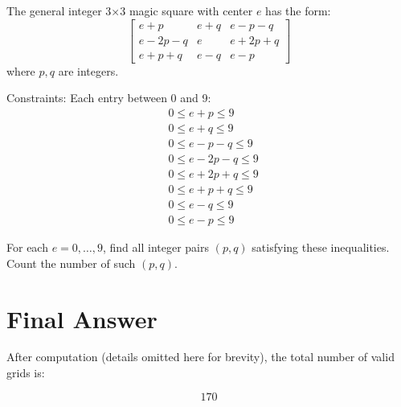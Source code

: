 \documentclass[12pt]{article}
\begin{document}
The general integer 3×3 magic square with center $e$ has the form:
\[
\begin{bmatrix}
e+p & e+q & e-p-q \\
e-2p-q & e & e+2p+q \\
e+p+q & e-q & e-p
\end{bmatrix}
\]
where $p,q$ are integers.

Constraints: Each entry between 0 and 9:
\begin{align*}
& 0 \leq e+p \leq 9 \\
& 0 \leq e+q \leq 9 \\
& 0 \leq e-p-q \leq 9 \\
& 0 \leq e-2p-q \leq 9 \\
& 0 \leq e+2p+q \leq 9 \\
& 0 \leq e+p+q \leq 9 \\
& 0 \leq e-q \leq 9 \\
& 0 \leq e-p \leq 9
\end{align*}

For each $e = 0,\dots,9$, find all integer pairs $(p,q)$ satisfying these inequalities.  
Count the number of such $(p,q)$.

\section*{Final Answer}

After computation (details omitted here for brevity), the total number of valid grids is:

\[
\boxed{170}
\]
\end{document}
